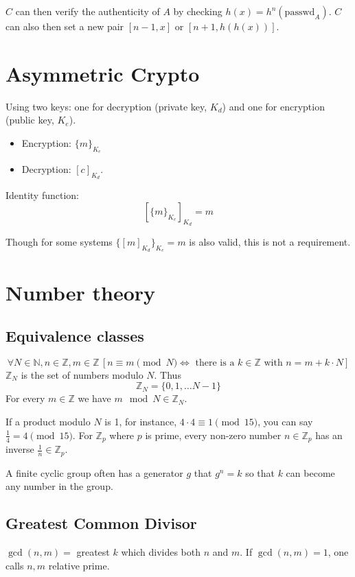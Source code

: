 \documentclass{article}
\newcommand{\wmod}[1]{\pmod{#1}}
\newcommand{\ZZ}{\mathbb{Z}}
\newcommand{\Z}{\ZZ}
\newcommand{\NN}{\mathbb{N}}
\newcommand{\N}{\NN}
\begin{document}
$C$ can then verify the authenticity of $A$ by checking $h(x)
= h^n(\text{passwd}_A)$. $C$ can also then set a new pair $[n-1,x]$ or
$[n+1, h(h(x))]$.

\section{Asymmetric Crypto}

Using two keys: one for decryption (private key, $K_d$) and one for encryption
(public key, $K_e$).

\begin{itemize}
  \item Encryption: $\{m\}_{K_e} $
  \item Decryption: $[c]_{K_d}$.
\end{itemize}

Identity function: 
\[
  [\{m\}_{K_e}]_{K_d} = m
\]

Though for some systems $\{[m]_{K_d}\}_{K_e} =m$ is also valid, this is not
a requirement.

\section{Number theory}

\subsection{Equivalence classes}

\[ \forall N \in \N, n \in \Z, m \in \Z 
  \,[n \equiv m \wmod{N} \Leftrightarrow 
      \text{ there is a } k \in \Z \text { with } n = m + k \cdot N]
\]
$\Z_N$ is the set of numbers modulo $N$. Thus 
\[ \Z_N = \{ 0, 1, \dots N-1\} \]
For every $m \in \Z$ we have $m \mod N \in \Z_N$.

If a product modulo $N$ is 1, for instance, $4 \cdot 4 \equiv 1 \wmod{15}$, you
can say $\frac{1}{4}=4 \wmod{15}$. For $\Z_p$ where $p$ is prime, every
non-zero number $n \in \Z_p$ has an inverse $\frac{1}{n} \in \Z_p$.

A finite cyclic group often has a generator $g$ that $g^n = k$ so that $k$ can become
any number in the group.

\subsection{Greatest Common Divisor}

$\gcd(n,m) = $ greatest $k$ which divides both $n$ and $m$. If $\gcd(n,m) = 1$, one
calls $n,m$ relative prime.
\end{document}

